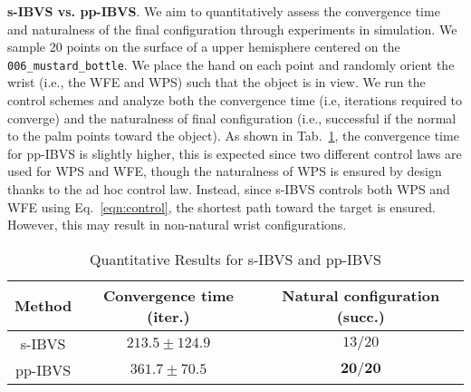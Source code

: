 \noindent\textbf{s-IBVS vs. pp-IBVS}. 
We aim to quantitatively assess the convergence time and naturalness of the final configuration through experiments in simulation. We sample 20 points on the surface of a upper hemisphere centered on the \texttt{006\_mustard\_bottle}. We place the hand on each point and randomly orient the wrist (i.e., the WFE and WPS) such that the object is in view. We run the control schemes and analyze both the convergence time (i.e, iterations required to converge) and the naturalness of final configuration (i.e., successful if the normal to the palm points toward the object). As shown in Tab.~\ref{table:vservo_quantitative}, the convergence time for pp-IBVS is slightly higher, this is expected since two different control laws are used for WPS and WFE, though the naturalness of WPS is ensured by design thanks to the ad hoc control law. Instead, since s-IBVS controls both WPS and WFE using Eq.~\ref{eqn:control}, the shortest path toward the target is ensured. However, this may result in non-natural wrist configurations.


\begin{table}
    \vspace{+0.2cm}
    \centering
    \renewcommand{\arraystretch}{1.2} %
    \caption{Quantitative Results for s-IBVS and pp-IBVS}
    \begin{tabular}{ccc} %
        \cline{1-3}
        Method & Convergence time (iter.) & Natural configuration (succ.) \\ \hline
        s-IBVS           & $\mathbf{213.5 \pm 124.9}$  & $13/20$ \\ 
        pp-IBVS          & $361.7 \pm 70.5$  & $\mathbf{20/20}$    \\ \hline
       
    \end{tabular}
    \label{table:vservo_quantitative}
    \vspace{-0.4cm}
\end{table}
    
